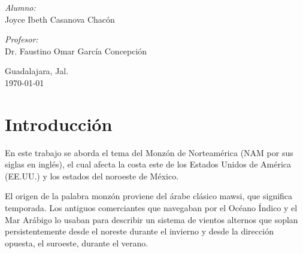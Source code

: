 \documentclass[12pt]{article}
\begin{document}
\begin{center}
\begin{center}
\emph{Alumno:}\\	
Joyce Ibeth Casanova Chacón\\
                        
\end{center}		
					\vspace{0.5cm} 											%
\begin{center}	\large	
\vspace{-0.6cm}											%
\emph{Profesor:} \\																	%
Dr. Faustino Omar García Concepción\\																									%
\end{center}	
\vspace*{1cm}


\vspace{1cm} 																				
\begin{center}	
Guadalajara, Jal. \\
{\large \today}																	%
 			\end{center}												  						
\end{center}	
\thispagestyle{empty} %
\clearpage\setcounter{page}{1} %
\newpage
\tableofcontents

\newpage
\listoffigures

\newpage
\clearpage\setcounter{page}{1} %
\section{Introducción}

En este trabajo se aborda el tema del Monzón de Norteamérica (NAM por sus siglas en inglés), el cual afecta la costa este de los Estados Unidos de América (EE.UU.) y los estados del noroeste de México.

El origen de la palabra monzón proviene del árabe clásico mawsi, que significa temporada. Los antiguos comerciantes que navegaban por el Océano Índico y el Mar Arábigo lo usaban para describir un sistema de vientos alternos que soplan persistentemente desde el noreste durante el invierno y desde la dirección opuesta, el suroeste, durante el verano.
\end{document}
